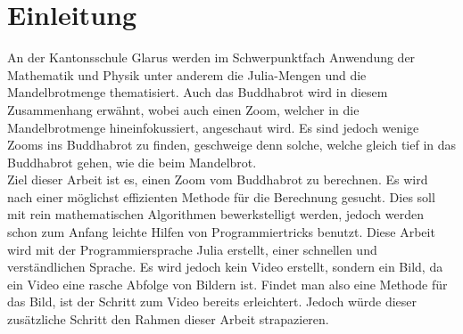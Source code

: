 \section{Einleitung}
An der Kantonsschule Glarus werden im Schwerpunktfach Anwendung der Mathematik und Physik unter anderem die Julia-Mengen und die Mandelbrotmenge thematisiert. Auch das Buddhabrot wird in diesem Zusammenhang erwähnt, wobei auch einen Zoom, welcher in die Mandelbrotmenge hineinfokussiert, angeschaut wird. Es sind jedoch wenige Zooms ins Buddhabrot zu finden, geschweige denn solche, welche gleich tief in das Buddhabrot gehen, wie die beim Mandelbrot.\\ 
Ziel dieser Arbeit ist es, einen Zoom vom Buddhabrot zu berechnen. Es wird nach einer möglichst effizienten Methode für die Berechnung gesucht. Dies soll mit rein mathematischen Algorithmen bewerkstelligt werden, jedoch werden schon zum Anfang leichte Hilfen von Programmiertricks benutzt. Diese Arbeit wird mit der Programmiersprache Julia erstellt, einer schnellen und verständlichen Sprache. Es wird jedoch kein Video erstellt, sondern ein Bild, da ein Video eine rasche Abfolge von Bildern ist. Findet man also eine Methode für das Bild, ist der Schritt zum Video bereits erleichtert. Jedoch würde dieser zusätzliche Schritt den Rahmen dieser Arbeit strapazieren.
